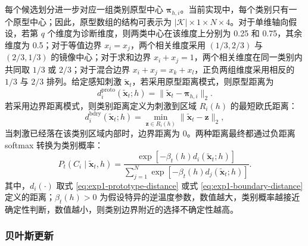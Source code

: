 每个候选划分进一步对应一组类别原型中心 $\boldsymbol{\pi}_{h,i}$。当前实现中，每个类别只有一个原型中心；因此，原型数组的结构可表示为 $|\mathcal K|\times 1\times N\times 4$。对于单维轴向假设，若第 $q$ 个维度为诊断维度，则两类中心在该维度上分别为 0.25 和 0.75，其余维度为 0.5；对于等值边界 $x_i=x_j$，两个相关维度采用 $(1/3,2/3)$ 与 $(2/3,1/3)$ 的镜像中心；对于求和边界 $x_i+x_j=1$，两个相关维度在同一类别内共同取 $1/3$ 或 $2/3$；对于混合边界 $x_i+x_j=x_k+x_l$，正负两组维度采用相反的 $1/3$ 与 $2/3$ 排列。给定感知刺激 $\tilde{\mathbf{x}}_t$，若采用原型距离模式，则原型距离为
\begin{equation}
    d_i^{\mathrm{proto}}(\tilde{\mathbf{x}}_t;h)
    =
    \|\tilde{\mathbf{x}}_t-\boldsymbol{\pi}_{h,i}\|_2.
    \label{eq:exp1-prototype-distance}
\end{equation}
若采用边界距离模式，则类别距离定义为刺激到区域 $R_i(h)$ 的最短欧氏距离：
\begin{equation}
    d_i^{\mathrm{bdry}}(\tilde{\mathbf{x}}_t;h)
    =
    \min_{\mathbf{z}\in R_i(h)}\|\tilde{\mathbf{x}}_t-\mathbf{z}\|_2,
    \label{eq:exp1-boundary-distance}
\end{equation}
当刺激已经落在该类别区域内部时，边界距离为 0。两种距离最终都通过负距离 softmax 转换为类别概率：
\begin{equation}
    P_t(C_i\mid\tilde{\mathbf{x}}_t,h)
    =
    \frac{\exp[-\beta_t(h)d_i(\tilde{\mathbf{x}}_t;h)]}
    {\sum_{j=1}^{N}\exp[-\beta_t(h)d_j(\tilde{\mathbf{x}}_t;h)]}.
    \label{eq:exp1-choice-probability}
\end{equation}
其中，$d_i(\cdot)$ 取式 \ref{eq:exp1-prototype-distance} 或式 \ref{eq:exp1-boundary-distance} 定义的距离；$\beta_t(h)>0$ 为假设特异的逆温度参数，数值越大，类别概率越接近确定性判断，数值越小，则类别边界附近的选择不确定性越高。

\subsubsection{贝叶斯更新}

